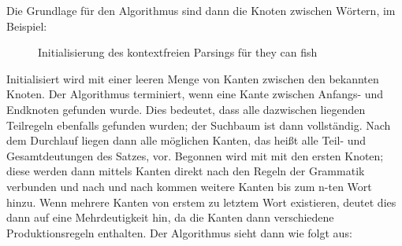 \documentclass[12pt]{report}
\begin{document}
Die Grundlage für den Algorithmus sind dann die Knoten zwischen Wörtern, im Beispiel: \\
\begin{figure}
\begin{center}
\caption{Initialisierung des kontextfreien Parsings für \glqq  they can fish\grqq{}}
\end{center}
\end{figure}
Initialisiert wird mit einer leeren Menge von Kanten zwischen den bekannten Knoten. Der Algorithmus terminiert, wenn eine Kante zwischen Anfangs- und Endknoten gefunden wurde. Dies bedeutet, dass alle dazwischen liegenden Teilregeln ebenfalls gefunden wurden; der Suchbaum ist dann vollständig. Nach dem Durchlauf liegen dann alle möglichen Kanten, das heißt alle Teil- und Gesamtdeutungen des Satzes, vor. Begonnen wird mit mit den ersten Knoten; diese werden dann mittels Kanten direkt nach den Regeln der Grammatik verbunden und nach und nach kommen weitere Kanten bis zum n-ten Wort hinzu. Wenn mehrere Kanten von erstem zu letztem Wort existieren, deutet dies dann auf eine Mehrdeutigkeit hin, da die Kanten dann verschiedene Produktionsregeln enthalten. Der Algorithmus sieht dann wie folgt aus:
\end{document}

